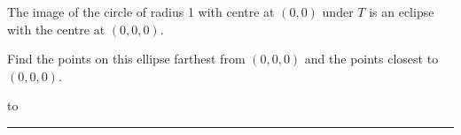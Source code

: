 \documentclass[11pt]{article}
\newcommand{\hdotrule}[1]{\hbox to \textwidth{\leaders\hbox to #1pt{\hss . \hss}\hfil}}
\begin{document}
\begin{preview}
\begin{enumerate}
            The image of the circle of radius 1 with centre at $(0,0)$ under $T$ is an eclipse with the centre at $(0,0,0)$. 
            
            Find the points on this ellipse farthest from $(0,0,0)$ and the points closest to $(0,0,0)$.

            \hdotrule{5}

      \end{enumerate}
      \hrule
\end{preview}
\end{document}
